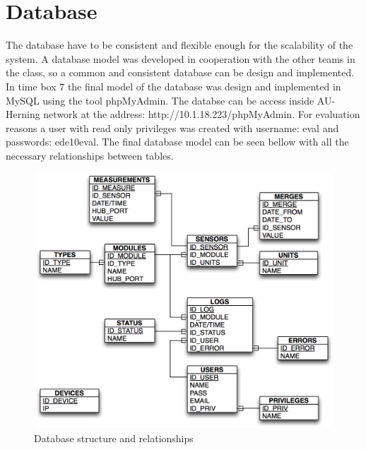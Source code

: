 \section{Database}
The database have to be consistent and flexible enough for the scalability of the system. A database model was developed in cooperation with the other teams in the class, so a common and consistent database can be design and implemented. 
\p
In time box 7 the final model of the database was design and implemented in MySQL using the tool phpMyAdmin. The databse can be access inside AU-Herning network at the address: http://10.1.18.223/phpMyAdmin. For evaluation reasons a user with read only privileges was created with username: eval and passwords: ede10eval.
\p
The final database model can be seen bellow with all the necessary relationships between tables.
\begin{figure}[H]
	\begin{centering}
		\includegraphics[width=1.0\textwidth]{images/db_datamodel.png}
		\caption{Database structure and relationships}
	\end{centering}
\end{figure}
%
